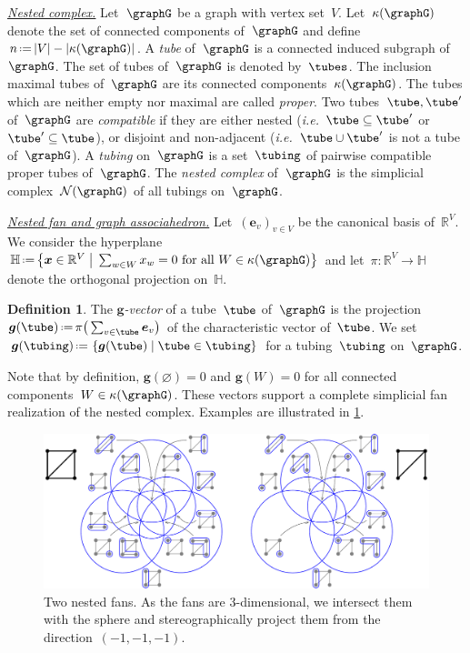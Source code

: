 \documentclass{amsart}
\theoremstyle{definition}
\newtheorem{definition}[theorem]{Definition}
\newcommand{\R}{\mathbb{R}} %
\newcommand{\HH}{\mathbb{H}} %
\renewcommand{\b}[1]{{\boldsymbol{#1}}} %
\newcommand{\set}[2]{\left\{ #1 \;\middle|\; #2 \right\}} %
\newcommand{\bigset}[2]{\big\{ #1 \;\big|\; #2 \big\}} %
\newcommand{\eqdef}{\mbox{\,\raisebox{0.2ex}{\scriptsize\ensuremath{\mathrm:}}\ensuremath{=}\,}} %
\newcommand{\ie}{\textit{i.e.}~} %
\newcommand{\darkblue}{\color{darkblue}} %
\newcommand{\defn}[1]{\textsl{\darkblue #1}} %
\newcommand{\para}[1]{\medskip\noindent\uline{\textit{#1.}}} %
\newcommand{\gvector}[1]{\b{g}(#1)} %
\newcommand{\gvectors}[1]{\b{g}(#1)} %
\newcommand{\ground}{V} %
\newcommand{\connectedComponents}{\kappa} %
\newcommand{\nestedComplex}{\mathcal{N}} %
\begin{document}
\para{Nested complex}
%
Let~$\graphG$ be a graph with vertex set~$\ground$.
Let~$\connectedComponents(\graphG)$ denote the set of connected components of~$\graphG$ and define~$n \eqdef |\ground|-|\connectedComponents(\graphG)|$.
A \defn{tube} of~$\graphG$ is a connected induced subgraph of~$\graphG$.
The set of tubes of~$\graphG$ is denoted by~$\tubes$.
The inclusion maximal tubes of~$\graphG$ are its connected components~$\connectedComponents(\graphG)$.
The tubes which are neither empty nor maximal are called \defn{proper}.
Two tubes~$\tube, \tube'$ of~$\graphG$ are \defn{compatible} if they are either nested (\ie $\tube \subseteq \tube'$ or~$\tube' \subseteq \tube$), or disjoint and non-adjacent (\ie $\tube \cup \tube'$ is not a tube of~$\graphG$).
A \defn{tubing} on~$\graphG$ is a set~$\tubing$ of pairwise compatible proper tubes of~$\graphG$.
The \defn{nested complex} of~$\graphG$ is the simplicial complex~$\nestedComplex(\graphG)$ of all tubings on~$\graphG$.

\para{Nested fan and graph associahedron}
%
Let~$(\b{e}_v)_{v \in \ground}$ be the canonical basis of~$\R^\ground$.
We consider the hyperplane~${\HH \eqdef \bigset{\b{x} \in \R^\ground}{\sum_{w \in W} x_w = 0 \text{ for all } W \in \connectedComponents(\graphG)}}$ and let~$\pi : \R^\ground \to \HH$ denote the orthogonal projection on~$\HH$.

\begin{definition}
The \defn{$\b{g}$-vector} of a tube~$\tube$ of~$\graphG$ is the projection~$\gvector{\tube} \eqdef \pi \big( \sum_{v \in \tube} \b{e}_v \big)$ of the characteristic vector of~$\tube$.
We set~$\gvectors{\tubing} \eqdef \set{\gvector{\tube}}{\tube \in \tubing}$ for a tubing~$\tubing$ on~$\graphG$.
\end{definition}

Note that by definition, $\gvector{\varnothing} = 0$ and $\gvector{W} = 0$ for all connected components~$W \in \connectedComponents(\graphG)$.
These vectors support a complete simplicial fan realization of the nested complex.
Examples are illustrated in \cref{fig:nestedFans}.

\begin{figure}[b]
	\capstart
	\centerline{\includegraphics[scale=.55]{nestedFans}}
	\caption{Two nested fans. As the fans are $3$-dimensional, we intersect them with the sphere and stereographically project them from the direction~$(-1,-1,-1)$.}
	\label{fig:nestedFans}
\end{figure}
\end{document}
